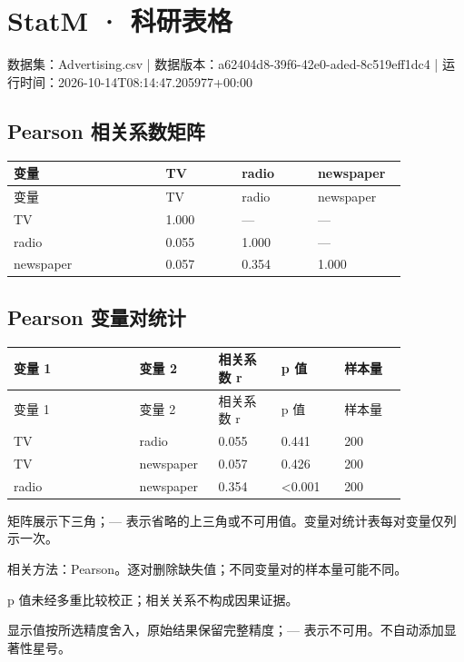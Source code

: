 \documentclass[UTF8]{ctexart}
\begin{document}
\section*{StatM · 科研表格}
数据集：Advertising.csv | 数据版本：a62404d8-39f6-42e0-aded-8c519eff1dc4 | 运行时间：2026-10-14T08:14:47.205977+00:00\par
{}
\subsection*{Pearson 相关系数矩阵}
\small
\setlength{\tabcolsep}{2pt}
\begin{longtable}{p{0.3440\linewidth}p{0.1720\linewidth}p{0.1720\linewidth}p{0.1720\linewidth}}
\toprule
变量 & TV & radio & newspaper \\
\midrule
\endfirsthead
\toprule
变量 & TV & radio & newspaper \\
\midrule
\endhead
TV & 1.000 & — & — \\
radio & 0.055 & 1.000 & — \\
newspaper & 0.057 & 0.354 & 1.000 \\
\bottomrule
\end{longtable}
\subsection*{Pearson 变量对统计}
\small
\setlength{\tabcolsep}{2pt}
\begin{longtable}{p{0.2867\linewidth}p{0.1433\linewidth}p{0.1433\linewidth}p{0.1433\linewidth}p{0.1433\linewidth}}
\toprule
变量 1 & 变量 2 & 相关系数 r & p 值 & 样本量 \\
\midrule
\endfirsthead
\toprule
变量 1 & 变量 2 & 相关系数 r & p 值 & 样本量 \\
\midrule
\endhead
TV & radio & 0.055 & 0.441 & 200 \\
TV & newspaper & 0.057 & 0.426 & 200 \\
radio & newspaper & 0.354 & \textless{}0.001 & 200 \\
\bottomrule
\end{longtable}
\noindent 矩阵展示下三角；— 表示省略的上三角或不可用值。变量对统计表每对变量仅列示一次。\par
\noindent 相关方法：Pearson。逐对删除缺失值；不同变量对的样本量可能不同。\par
\noindent p 值未经多重比较校正；相关关系不构成因果证据。\par
\noindent 显示值按所选精度舍入，原始结果保留完整精度；— 表示不可用。不自动添加显著性星号。\par
\end{document}

